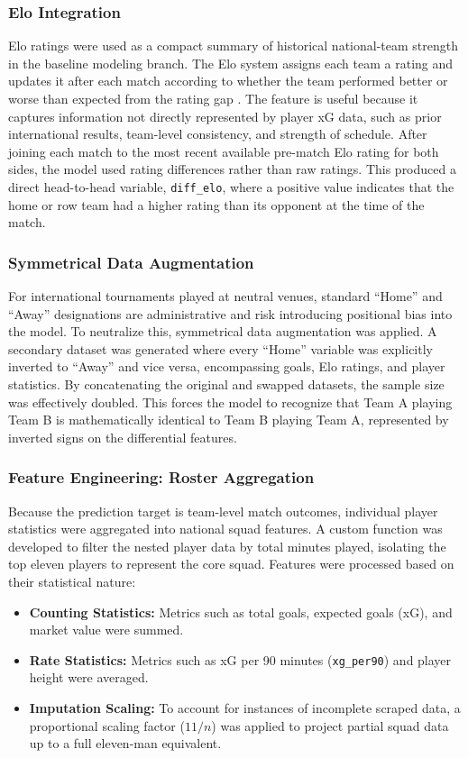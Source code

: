 \documentclass[11pt]{article}
\begin{document}
\subsubsection{Elo Integration}
\label{subsec:elo_integration}
Elo ratings were used as a compact summary of historical national-team strength in the baseline modeling branch. The Elo system assigns each team a rating and updates it after each match according to whether the team performed better or worse than expected from the rating gap \cite{elo1978,hvattum2010elo}. The feature is useful because it captures information not directly represented by player xG data, such as prior international results, team-level consistency, and strength of schedule. After joining each match to the most recent available pre-match Elo rating for both sides, the model used rating differences rather than raw ratings. This produced a direct head-to-head variable, \texttt{diff\_elo}, where a positive value indicates that the home or row team had a higher rating than its opponent at the time of the match.

\subsubsection{Symmetrical Data Augmentation}
\label{subsec:augmentation}
For international tournaments played at neutral venues, standard ``Home'' and ``Away'' designations are administrative and risk introducing positional bias into the model. To neutralize this, symmetrical data augmentation was applied. A secondary dataset was generated where every ``Home'' variable was explicitly inverted to ``Away'' and vice versa, encompassing goals, Elo ratings, and player statistics. By concatenating the original and swapped datasets, the sample size was effectively doubled. This forces the model to recognize that Team A playing Team B is mathematically identical to Team B playing Team A, represented by inverted signs on the differential features.

\subsubsection{Feature Engineering: Roster Aggregation}
\label{subsec:roster_aggregation}
Because the prediction target is team-level match outcomes, individual player statistics were aggregated into national squad features. A custom function was developed to filter the nested player data by total minutes played, isolating the top eleven players to represent the core squad. Features were processed based on their statistical nature:
\begin{itemize}
    \item \textbf{Counting Statistics:} Metrics such as total goals, expected goals (xG), and market value were summed.
    \item \textbf{Rate Statistics:} Metrics such as xG per 90 minutes (\texttt{xg\_per90}) and player height were averaged.
    \item \textbf{Imputation Scaling:} To account for instances of incomplete scraped data, a proportional scaling factor ($11 / n$) was applied to project partial squad data up to a full eleven-man equivalent.
\end{itemize}
\end{document}
